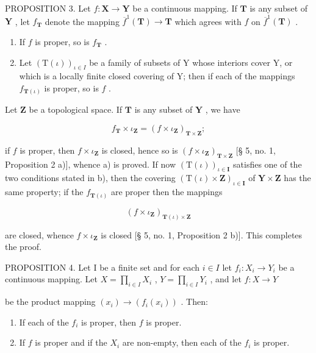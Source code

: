 PROPOSITION 3. Let \(f: \mathbf{X} \to \mathbf{Y}\) be a continuous mapping. If \(\mathbf{T}\) is any subset of \(\mathbf{Y}\) , let \(f_{\mathbf{T}}\) denote the mapping \(\overline{f}^{1}(\mathbf{T}) \to \mathbf{T}\) which agrees with \(f\) on \(\overline{f}^{1}(\mathbf{T})\) .

\begin{enumerate}
\def\labelenumi{\alph{enumi})}
\item
  If \(f\) is proper, so is \(f_{\mathbf{T}}\) .
\item
  Let \((\mathrm{T}(\iota))_{\iota\in I}\) be a family of subsets of Y whose interiors cover Y, or which is a locally finite closed covering of Y; then if each of the mappings \(f_{\mathbf{T}(\iota)}\) is proper, so is \(f\) .
\end{enumerate}

Let \(\mathbf{Z}\) be a topological space. If \(\mathbf{T}\) is any subset of \(\mathbf{Y}\) , we have

\[
f _ {\mathbf {T}} \times \iota_ {\mathbf {Z}} = (f \times \iota_ {\mathbf {Z}}) _ {\mathbf {T} \times \mathbf {Z}};
\]

if \(f\) is proper, then \(f \times \iota_{\mathbf{Z}}\) is closed, hence so is \((f \times \iota_{\mathbf{Z}})_{\mathbf{T} \times \mathbf{Z}}\) {[}§ 5, no. 1, Proposition 2 a){]}, whence a) is proved. If now \((\mathrm{T}(\iota))_{\iota \in \mathbf{I}}\) satisfies one of the two conditions stated in b), then the covering \((\mathrm{T}(\iota) \times \mathbf{Z})_{\iota \in \mathbf{I}}\) of \(\mathbf{Y} \times \mathbf{Z}\) has the same property; if the \(f_{\mathbf{T}(\iota)}\) are proper then the mappings

\[
(f \times \iota_ {\mathbf {Z}}) _ {\mathbf {T} (\iota) \times \mathbf {Z}}
\]

are closed, whence \(f \times \iota_{\mathbf{Z}}\) is closed {[}§ 5, no. 1, Proposition 2 b){]}. This completes the proof.

PROPOSITION 4. Let I be a finite set and for each \(i \in I\) let \(f_i: X_i \to Y_i\) be a continuous mapping. Let \(X = \prod_{i \in I} X_i\) , \(Y = \prod_{i \in I} Y_i\) , and let \(f: X \to Y\)

be the product mapping \((x_{i})\to (f_{i}(x_{i}))\) . Then:

\begin{enumerate}
\def\labelenumi{\alph{enumi})}
\item
  If each of the \(f_i\) is proper, then \(f\) is proper.
\item
  If \(f\) is proper and if the \(X_i\) are non-empty, then each of the \(f_i\) is proper.
\end{enumerate}

